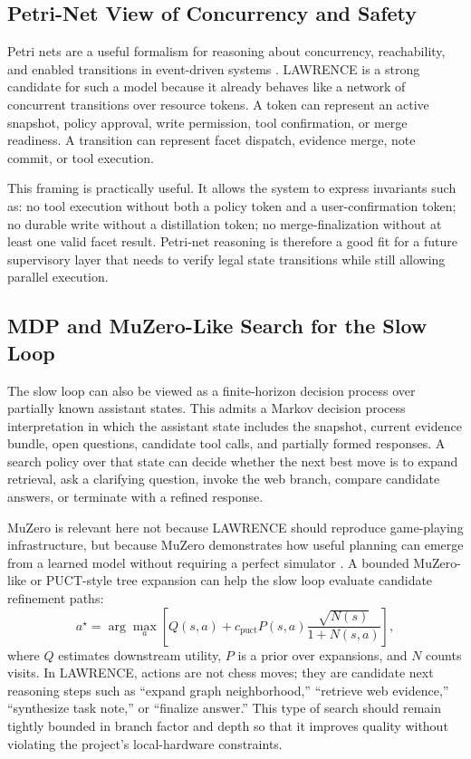 \documentclass[conference]{IEEEtran}
\begin{document}
\subsection{Petri-Net View of Concurrency and Safety}
Petri nets are a useful formalism for reasoning about concurrency, reachability, and enabled transitions in event-driven systems \cite{murata1989petri}. LAWRENCE is a strong candidate for such a model because it already behaves like a network of concurrent transitions over resource tokens. A token can represent an active snapshot, policy approval, write permission, tool confirmation, or merge readiness. A transition can represent facet dispatch, evidence merge, note commit, or tool execution.

This framing is practically useful. It allows the system to express invariants such as: no tool execution without both a policy token and a user-confirmation token; no durable write without a distillation token; no merge-finalization without at least one valid facet result. Petri-net reasoning is therefore a good fit for a future supervisory layer that needs to verify legal state transitions while still allowing parallel execution.

\subsection{MDP and MuZero-Like Search for the Slow Loop}
The slow loop can also be viewed as a finite-horizon decision process over partially known assistant states. This admits a Markov decision process interpretation \cite{puterman1994mdp} in which the assistant state includes the snapshot, current evidence bundle, open questions, candidate tool calls, and partially formed responses. A search policy over that state can decide whether the next best move is to expand retrieval, ask a clarifying question, invoke the web branch, compare candidate answers, or terminate with a refined response.

MuZero is relevant here not because LAWRENCE should reproduce game-playing infrastructure, but because MuZero demonstrates how useful planning can emerge from a learned model without requiring a perfect simulator \cite{schrittwieser2020muzero}. A bounded MuZero-like or PUCT-style tree expansion can help the slow loop evaluate candidate refinement paths:
\begin{equation}
\label{eq:puct}
a^\star = \arg\max_a \left[
Q(s,a) + c_{\mathrm{puct}} P(s,a)\frac{\sqrt{N(s)}}{1+N(s,a)}
\right],
\end{equation}
where $Q$ estimates downstream utility, $P$ is a prior over expansions, and $N$ counts visits. In LAWRENCE, actions are not chess moves; they are candidate next reasoning steps such as ``expand graph neighborhood,'' ``retrieve web evidence,'' ``synthesize task note,'' or ``finalize answer.'' This type of search should remain tightly bounded in branch factor and depth so that it improves quality without violating the project's local-hardware constraints.
\end{document}
